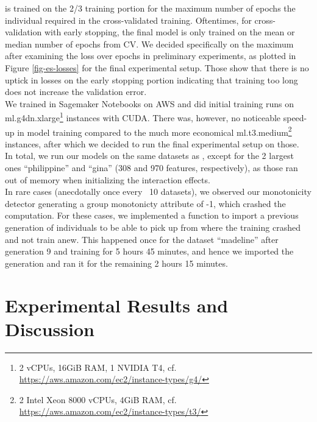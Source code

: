 \documentclass[twoside,11pt]{article}
\begin{document}
is trained on the 2/3 training portion for the maximum number of epochs the individual required in the cross-validated training.
Oftentimes, for cross-validation with early stopping, the final model is only trained on the mean or median number of epochs from CV.
We decided specifically on the maximum after examining the loss over epochs in preliminary experiments, as plotted in Figure \ref{fig-es-losses}
for the final experimental setup. Those show that there is no uptick in losses on the early stopping portion indicating that training too long does not increase
the validation error.
\\
We trained in Sagemaker Notebooks on AWS and did initial training runs on
ml.g4dn.xlarge\footnote{2 vCPUs, 16GiB RAM, 1 NVIDIA T4, cf. \url{https://aws.amazon.com/ec2/instance-types/g4/}} instances with CUDA.
There was, however, no noticeable speed-up in model training compared to the much more economical
ml.t3.medium\footnote{2 Intel Xeon 8000 vCPUs, 4GiB RAM, cf. \url{https://aws.amazon.com/ec2/instance-types/t3/}} instances, after which we decided to run the
final experimental setup on those.
\\
In total, we run our models on the same datasets as \citet[p. 544]{EAGGA}, except for the 2 largest ones ``philippine'' and ``gina'' (308 and 970 features, respectively),
as those ran out of memory when initializing the interaction effects.
\\
In rare cases (anecdotally once every ~10 datasets), we observed our monotonicity detector generating a group monotonicty attribute of -1, which crashed the computation.
For these cases, we implemented a function to import a previous generation of individuals to be able to pick up from where the training crashed and not train anew.
This happened once for the dataset ``madeline'' after generation 9 and training for 5 hours 45 minutes, and hence we imported the generation and ran it for the remaining
2 hours 15 minutes.


\section{Experimental Results and Discussion}
\end{document}

